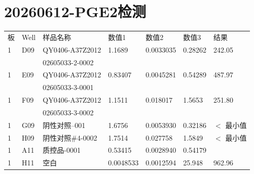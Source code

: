 \documentclass[UTF8,10pt,a4paper,fontset=fandol]{ctexart}
\begin{document}
\section*{20260612-PGE2检测}

\begin{tabular}{llllll}
板 & Well & 样品名称 & 数值1 & 数值2 & 数值3 & 结果 \\
1 & D09 & QY0406-A37Z2012 & 1.1689 & 0.0033035 & 0.28262 & 242.05 \\
  &     & 02605033-2-0002 &        &          &        &       \\
1 & E09 & QY0406-A37Z2012 & 0.83407 & 0.0045281 & 0.54289 & 487.97 \\
  &     & 02605033-3-0001 &         &           &         &        \\
1 & F09 & QY0406-A37Z2012 & 1.1511 & 0.018017 & 1.5653 & 251.80 \\
  &     & 02605033-3-0002 &        &          &        &        \\
1 & G09 & 阴性对照--001 & 1.6756 & 0.0053930 & 0.32186 & $<$ 最小值 \\
1 & H09 & 阴性对照\#4-0002 & 1.7514 & 0.027758 & 1.5849 & $<$ 最小值 \\
1 & A11 & 质控品-0001 & 0.53415 & 0.0028940 & 0.54179 & \\
1 & H11 & 空白 & 0.0048533 & 0.0012594 & 25.948 & 962.96
\end{tabular}

\vspace{1em}
\end{document}
